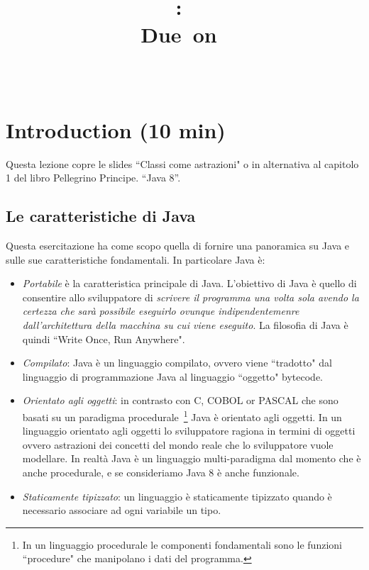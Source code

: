 \documentclass{article}
\title{
\vspace{2in}
\textmd{\textbf{\hmwkClass:\ \hmwkTitle}}\\
\normalsize\vspace{0.1in}\small{Due\ on\ \hmwkDueDate}\\
\vspace{0.1in}\large{\textit{\hmwkClassInstructor\ \hmwkClassTime}}
\vspace{3in}
}
\author{\textbf{\hmwkAuthorName}}
\date{} %
\theoremstyle{definition}
\begin{document}
\maketitle



\newpage
\tableofcontents
\newpage



\section{Introduction (10 min)}
Questa lezione copre le  slides ``Classi come astrazioni" o in alternativa al capitolo  1 del libro  Pellegrino Principe. “Java 8”.


\subsection{Le caratteristiche di Java}
Questa esercitazione ha come scopo quella di fornire una panoramica su Java e sulle sue caratteristiche fondamentali. In particolare Java \`e:
\begin{itemize}
\item \emph{Portabile} \`e la caratteristica principale di Java. L'obiettivo di Java \`e quello di consentire allo sviluppatore di  \emph{scrivere il programma una volta sola avendo la certezza che sar\`a possibile eseguirlo ovunque indipendentemenre dall'architettura della macchina su cui viene eseguito}. La filosofia di Java \`e quindi ``Write Once, Run Anywhere".
\item \emph{Compilato}: Java \`e un linguaggio compilato, ovvero viene ``tradotto" dal linguaggio di programmazione Java al linguaggio ``oggetto" bytecode. 
\item \emph{Orientato agli oggetti}: in contrasto con C, COBOL or PASCAL che sono basati su un paradigma procedurale~\footnote{In un linguaggio procedurale le componenti fondamentali sono le funzioni ``procedure" che manipolano i dati del programma.} Java \`e orientato agli oggetti. In un linguaggio orientato agli oggetti lo sviluppatore ragiona in termini di oggetti ovvero astrazioni dei concetti del mondo reale che lo sviluppatore vuole modellare. In realt\`a Java \`e un linguaggio multi-paradigma dal momento che \`e anche procedurale, e se consideriamo Java 8 \`e anche funzionale.
\item \emph{Staticamente tipizzato}: un linguaggio \`e staticamente tipizzato quando \`e necessario associare ad ogni variabile un tipo.
\end{itemize}
\end{document}
